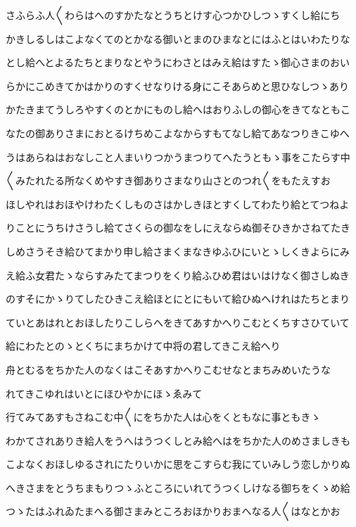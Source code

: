 \documentclass[a4paper,11pt,landscape]{ltjtarticle}
\begin{document}
さふらふ人〱わらはへのすかたなとうちとけす心つかひしつゝすくし給にち
\par\medskip
かきしるしはこよなくてのとかなる御いとまのひまなとにはふとはいわたりな
\par\medskip
とし給へとよるたちとまりなとやうにわさとはみえ給はすたゝ御心さまのおい
\par\medskip
らかにこめきてかはかりのすくせなりける身にこそあらめと思ひなしつゝあり
\par\medskip
かたきまてうしろやすくのとかにものし給へはおりふしの御心をきてなともこ
\par\medskip
なたの御ありさまにおとるけちめこよなからすもてなし給てあなつりきこゆへ
\par\medskip
うはあらねはおなしこと人まいりつかうまつりてへたうともゝ事をこたらす中
\par\medskip
〱みたれたる所なくめやすき御ありさまなり山さとのつれ〱をもたえすお
\par\medskip
ほしやれはおほやけわたくしものさはかしきほとすくしてわたり給とてつねよ
\par\medskip
りことにうちけさうし給てさくらの御なをしにえならぬ御そひきかさねてたき
\par\medskip
しめさうそき給ひてまかり申し給さまくまなきゆふひにいとゝしくきよらにみ
\par\medskip
え給ふ女君たゝならすみたてまつりをくり給ふひめ君はいはけなく御さしぬき
\par\medskip
のすそにかゝりてしたひきこえ給ほとにとにもいて給ひぬへけれはたちとまり
\par\medskip
ていとあはれとおほしたりこしらへをきてあすかへりこむとくちすさひていて
\par\medskip
給にわたとのゝとくちにまちかけて中将の君してきこえ給へり
\par\medskip
舟とむるをちかた人のなくはこそあすかへりこむせなとまちみめいたうな
\par\medskip
れてきこゆれはいとにほひやかにほゝゑみて
\par\medskip
行てみてあすもさねこむ中〱にをちかた人は心をくともなに事ともきゝ
\par\medskip
わかてされありき給人をうへはうつくしとみ給へはをちかた人のめさましきも
\par\medskip
こよなくおほしゆるされにたりいかに思をこすらむ我にていみしう恋しかりぬ
\par\medskip
へきさまをとうちまもりつゝふところにいれてうつくしけなる御ちをくゝめ給
\par\medskip
つゝたはふれゐたまへる御さまみところおほかりおまへなる人〱はなとかお
\end{document}
